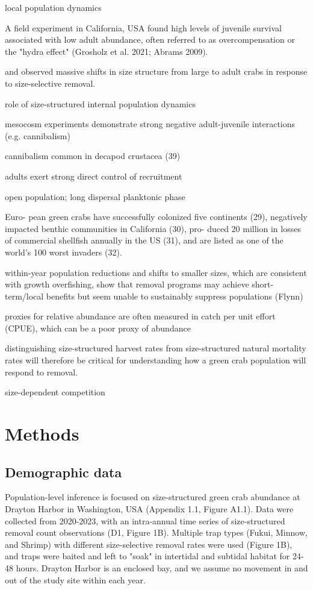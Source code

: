 \documentclass{article}
\begin{document}
local population dynamics

A field experiment in California, USA found high levels of juvenile survival associated with low adult abundance, often referred to as overcompensation or the "hydra effect" (Grosholz et al. 2021; Abrams 2009).

and observed massive shifts in size structure from large to adult crabs in response to size-selective removal.

role of size-structured internal population dynamics

mesocosm experiments demonstrate strong negative adult-juvenile interactions (e.g. cannibalism) 

cannibalism common in decapod crustacea (39)

adults exert strong direct control of recruitment

open population; long dispersal planktonic phase

Euro- pean green crabs have successfully colonized five continents (29), negatively impacted benthic communities in California (30), pro- duced 20 million in losses of commercial shellfish annually in the US (31), and are listed as one of the world’s 100 worst invaders (32).

within-year population reductions and shifts to smaller sizes, which are consistent with growth overfishing, show that removal programs may achieve short-term/local benefits but seem unable to sustainably suppress populations (Flynn)

proxies for relative abundance are often measured in catch per unit effort (CPUE), which can be a poor proxy of  abundance

distinguishing size-structured harvest rates from size-structured natural mortality rates will therefore be critical for understanding how a green crab population will respond to removal.

size-dependent competition

\section{Methods}

\subsection{Demographic data}

Population-level inference is focused on size-structured green crab abundance at Drayton Harbor in Washington, USA (Appendix 1.1, Figure A1.1). Data were collected from 2020-2023, with an intra-annual time series of size-structured removal count observations (D1, Figure 1B). Multiple trap types (Fukui, Minnow, and Shrimp) with different size-selective removal rates were used (Figure 1B), and traps were baited and left to "soak" in intertidal and subtidal habitat for 24-48 hours. Drayton Harbor is an enclosed bay, and we assume no movement in and out of the study site within each year. 
\end{document}

